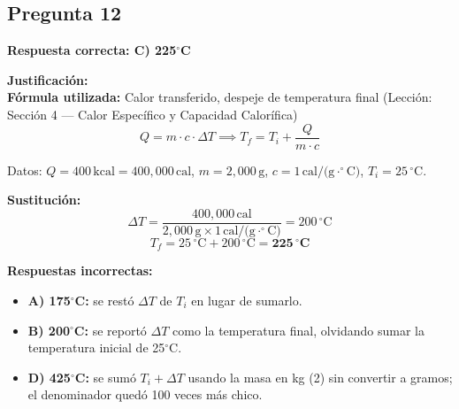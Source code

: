 \begin{respuestabox}
\subsection{Pregunta 12}
\textcolor{verdecorrecto}{\textbf{Respuesta correcta: C) 225$^\circ$C}}

\textbf{Justificación:}\\
\textbf{Fórmula utilizada:} Calor transferido, despeje de temperatura final (Lección: Sección 4 --- Calor Específico y Capacidad Calorífica)
$$Q = m \cdot c \cdot \Delta T \implies T_f = T_i + \frac{Q}{m \cdot c}$$

Datos: $Q = 400\,\text{kcal} = 400{,}000\,\text{cal}$, $m = 2{,}000\,\text{g}$, $c = 1\,\text{cal/(g}\cdot^\circ\text{C)}$, $T_i = 25\,^\circ\text{C}$.

\textbf{Sustitución:}
$$\Delta T = \frac{400{,}000\,\text{cal}}{2{,}000\,\text{g} \times 1\,\text{cal/(g}\cdot^\circ\text{C)}} = 200\,^\circ\text{C}$$
$$T_f = 25\,^\circ\text{C} + 200\,^\circ\text{C} = \mathbf{225\,^\circ\text{C}}$$

\textbf{Respuestas incorrectas:}
\begin{itemize}
    \item \textbf{A) 175$^\circ$C:} se restó $\Delta T$ de $T_i$ en lugar de sumarlo.
    \item \textbf{B) 200$^\circ$C:} se reportó $\Delta T$ como la temperatura final, olvidando sumar la temperatura inicial de 25$^\circ$C.
    \item \textbf{D) 425$^\circ$C:} se sumó $T_i + \Delta T$ usando la masa en kg (2) sin convertir a gramos; el denominador quedó 100 veces más chico.
\end{itemize}
\end{respuestabox}

